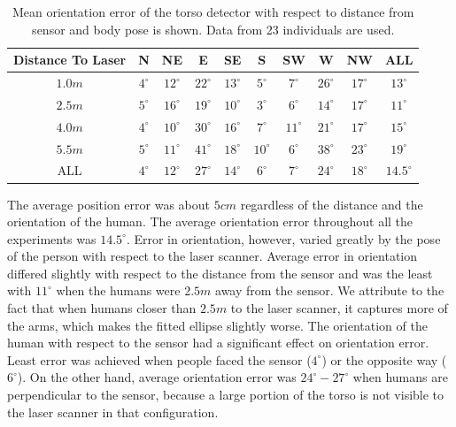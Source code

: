 \begin{table}[ht!]
\caption{Mean orientation error of the torso detector with respect to distance from sensor and body pose is shown. Data from 23 individuals are used.}
\centering
\begin{tabular}{cSSSSSSSSS}    
\toprule
Distance To Laser & {N} & {NE} & {E} & {SE} & {S} & {SW} & {W} & {NW} & {ALL}\\
\midrule
{$1.0m$} & {$4^{\circ}$} & {$12^{\circ}$} & {$22^{\circ}$} & {$13^{\circ}$} & {$5^{\circ}$} & {$7^{\circ}$} & {$26^{\circ}$} & {$17^{\circ}$} & {$13^{\circ}$} \\
{$2.5m$} & {$5^{\circ}$} & {$16^{\circ}$} & {$19^{\circ}$} & {$10^{\circ}$} & {$3^{\circ}$} & {$6^{\circ}$} & {$14^{\circ}$} & {$17^{\circ}$} & {$11^{\circ}$} \\ 

{$4.0m$} & {$4^{\circ}$} & {$10^{\circ}$} & {$30^{\circ}$} & {$16^{\circ}$} & {$7^{\circ}$} & {$11^{\circ}$} & {$21^{\circ}$} & {$17^{\circ}$} & {$15^{\circ}$} \\ 
{$5.5m$} & {$5^{\circ}$} & {$11^{\circ}$} & {$41^{\circ}$} & {$18^{\circ}$} & {$10^{\circ}$} & {$6^{\circ}$} & {$38^{\circ}$} & {$23^{\circ}$} & {$19^{\circ}$} \\ 

{ALL} & {$4^{\circ}$} & {$12^{\circ}$} & {$27^{\circ}$} & {$14^{\circ}$} & {$6^{\circ}$} & {$7^{\circ}$} & {$24^{\circ}$} & {$18^{\circ}$} & {$14.5^{\circ}$} \\
\bottomrule
\end{tabular}
\label{table:torso_tracking_results}
\end{table}

The average position error was about $5cm$ regardless of the distance and the orientation of the human. The average orientation error throughout all the experiments was $14.5^{\circ}$. Error in orientation, however, varied greatly by the pose of the person with respect to the laser scanner. Average error in orientation differed slightly with respect to the distance from the sensor and was the least with $11^{\circ}$ when the humans were $2.5m$ away from the sensor. We attribute to the fact that when humans closer than $2.5m$ to the laser scanner, it captures more of the arms, which makes the fitted ellipse slightly worse. The orientation of the human with respect to the sensor had a significant effect on orientation error. Least error was achieved when people faced the sensor  ($4^{\circ}$) or the opposite way ($6^{\circ}$). On the other hand, average orientation error was $24^{\circ}-27^{\circ}$ when humans are perpendicular to the sensor, because a large portion of the torso is not visible to the laser scanner in that configuration.

